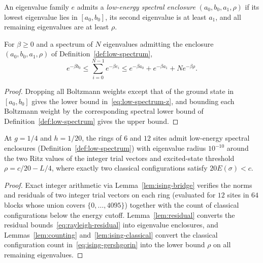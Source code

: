 \begin{definition}
  \label{def:low-spectrum}
  \leanok
  An eigenvalue family \(e\) admits a \emph{low-energy spectral enclosure} \((a_0, b_0, a_1, \rho)\)
  if its lowest eigenvalue lies in \([a_0, b_0]\), its second eigenvalue is at least \(a_1\), and
  all remaining eigenvalues are at least \(\rho\).
\end{definition}

\begin{lemma}
  \label{lem:low-spectrum-z}
  \leanok
  For \(\beta \ge 0\) and a spectrum of \(N\) eigenvalues admitting the enclosure
  \((a_0, b_0, a_1, \rho)\) of Definition~\ref{def:low-spectrum},
  \begin{equation}
    \label{eq:low-spectrum-z}
    e^{-\beta b_0} \le \sum_{i=0}^{N-1} e^{-\beta e_i} \le e^{-\beta a_0} + e^{-\beta a_1} +
    N e^{-\beta \rho}.
  \end{equation}
\end{lemma}
\begin{proof}
  \leanok
  Dropping all Boltzmann weights except that of the ground state in \([a_0, b_0]\) gives the lower
  bound in~\eqref{eq:low-spectrum-z}, and bounding each Boltzmann weight by the corresponding
  spectral lower bound of Definition~\ref{def:low-spectrum} gives the upper bound.
\end{proof}

\begin{lemma}
  \label{lem:ising-low-spectra}
  \leanok
  At \(g = 1/4\) and \(h = 1/20\), the rings of \(6\) and \(12\) sites admit low-energy spectral
  enclosures (Definition~\ref{def:low-spectrum}) with eigenvalue radius \(10^{-10}\) around the two
  Ritz values of the integer trial vectors and excited-state threshold \(\rho = c/20 - L/4\), where
  exactly two classical configurations satisfy \(20 E(\sigma) < c\).
\end{lemma}
\begin{proof}
  \leanok
  Exact integer arithmetic via Lemma~\ref{lem:ising-bridge} verifies the norms and residuals of two
  integer trial vectors on each ring (evaluated for \(12\) sites in \(64\) blocks whose union
  covers \(\{0, \dots, 4095\}\)) together with the count of classical configurations below the
  energy cutoff. Lemma~\ref{lem:residual} converts the residual bounds~\eqref{eq:rayleigh-residual}
  into eigenvalue enclosures, and Lemmas~\ref{lem:counting} and~\ref{lem:ising-classical} convert
  the classical configuration count in~\eqref{eq:ising-gershgorin} into the lower bound \(\rho\) on
  all remaining eigenvalues.
\end{proof}

